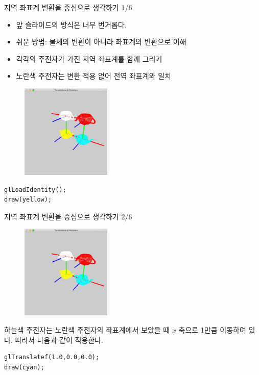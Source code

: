 \documentclass{beamer}
\begin{document}
\begin{frame}[fragile]{지역 좌표계 변환을 중심으로 생각하기 1/6}

\begin{itemize}
\item 앞 슬라이드의 방식은 너무 번거롭다.
\item 쉬운 방법: 물체의 변환이 아니라 좌표계의 변환으로 이해
\item 각각의 주전자가 가진 지역 좌표계를 함께 그리기
\item 노란색 주전자는 변환 적용 없어 전역 좌표계와 일치
\end{itemize}

\begin{figure}
    \includegraphics[height=4.5cm]{OGL_transform/localCoordXform.png}
\end{figure}

\begin{verbatim}
glLoadIdentity();
draw(yellow);
\end{verbatim}

\end{frame}


\begin{frame}[fragile]{지역 좌표계 변환을 중심으로 생각하기 2/6}

\begin{figure}
    \includegraphics[height=4.5cm]{OGL_transform/localCoordXform.png}
\end{figure}

하늘색 주전자는 노란색 주전자의 좌표계에서 보았을 때 $x$ 축으로 1만큼 이동하여 있다. 따라서 다음과 같이 적용한다.

\begin{verbatim}
glTranslatef(1.0,0.0,0.0);
draw(cyan);
\end{verbatim}

\end{frame}
\end{document}
